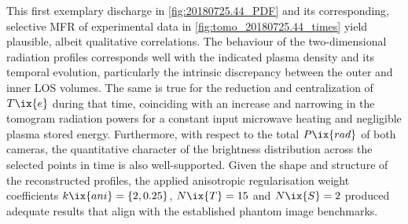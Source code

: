             This first exemplary discharge in \cref{fig:20180725.44_PDF} and its corresponding, selective MFR of experimental data in \cref{fig:tomo_20180725.44_times} yield plausible, albeit qualitative correlations. The behaviour of the two-dimensional radiation profiles corresponds well with the indicated plasma density and its temporal evolution, particularly the intrinsic discrepancy between the outer and inner LOS volumes. The same is true for the reduction and centralization of $T\ix{e}$ during that time, coinciding with an increase and narrowing in the tomogram radiation powers for a constant input microwave heating and negligible plasma stored energy. Furthermore, with respect to the total $P\ix{rad}$ of both cameras, the quantitative character of the brightness distribution across the selected points in time is also well-supported. Given the shape and structure of the reconstructed profiles, the applied anisotropic regularisation weight coefficients $k\ix{ani}=\left\{2, 0.25\right\}$, $N\ix{T}=15$ and $N\ix{S}=2$ produced adequate results that align with the established phantom image benchmarks.%
%
